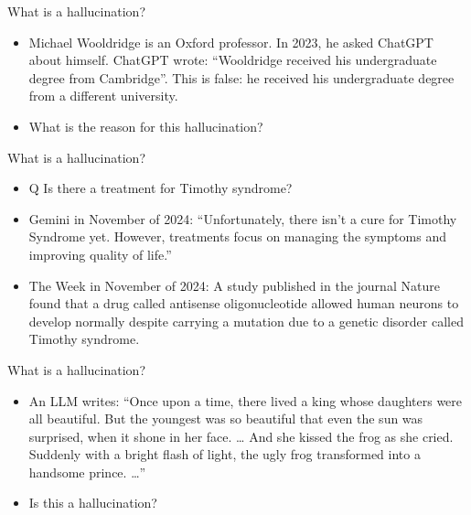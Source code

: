 \begin{vbframe}{What is a hallucination?}

\vfill


	\begin{itemize}


\item
Michael Wooldridge is an Oxford professor. In 2023, he
asked ChatGPT about himself. ChatGPT wrote:
``Wooldridge received his undergraduate degree from
Cambridge''. This is false:
he received his undergraduate degree from a different
university.

\item \ques What is the reason for this hallucination?

\end{itemize}

\vfill

\end{vbframe}


\begin{vbframe}{What is a hallucination?}

\vfill


	\begin{itemize}


\item Q Is there a treatment for Timothy syndrome?
\item Gemini in November of 2024:
``Unfortunately, there isn't a cure for Timothy Syndrome
yet. However, treatments focus on managing the symptoms and
improving quality of life.''
\item The Week in November of 2024:
A study published in the journal Nature found that a drug
called antisense oligonucleotide allowed human neurons to
develop normally despite carrying a mutation due to a
genetic disorder called Timothy syndrome.
\end{itemize}


\vfill

\end{vbframe}


\begin{vbframe}{What is a hallucination?}

\vfill


	\begin{itemize}


\item An LLM writes:
``Once upon a time, there
lived a king whose daughters
were all beautiful. But the
youngest was so beautiful
that even the sun was
surprised, when it shone in
her face. \ldots
 And she kissed the frog as she cried.
       Suddenly with a bright flash of light, the ugly frog
       transformed into a handsome prince.
       \ldots''
       
\item \ques Is this a hallucination?
\end{itemize}

\vfill

\end{vbframe}



